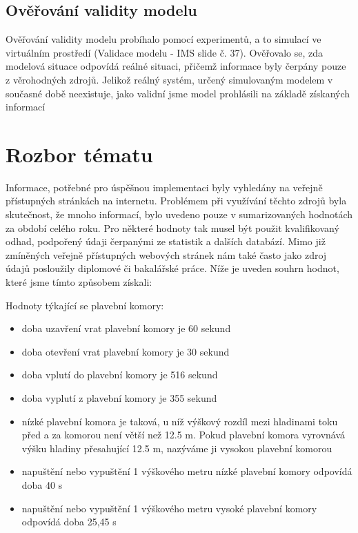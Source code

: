 \documentclass[11pt,a4paper]{article}
\begin{document}
    \subsection{Ověřování validity modelu}

      Ověřování validity modelu probíhalo pomocí experimentů, a to simulací ve
      virtuálním prostředí (Validace modelu - IMS slide č. 37). Ověřovalo se,
      zda modelová situace odpovídá reálné situaci, přičemž informace
      byly čerpány pouze z věrohodných zdrojů. Jelikož reálný systém,
      určený simulovaným modelem v současné době neexistuje, jako validní jsme
      model prohlásili na základě získaných informací

  \section{Rozbor tématu}

    Informace, potřebné pro úspěšnou implementaci byly vyhledány na veřejně
    přístupných stránkách na internetu. Problémem při využívání těchto zdrojů
    byla skutečnost, že mnoho informací, bylo uvedeno pouze v sumarizovaných
    hodnotách za období celého roku.  Pro některé hodnoty tak musel být použit
    kvalifikovaný odhad, podpořený údaji čerpanými ze statistik a dalších
    databází. Mimo již zmíněných veřejně přístupných webových stránek nám také
    často jako zdroj údajů posloužily diplomové či bakalářské práce. Níže je
    uveden souhrn hodnot, které jsme tímto způsobem získali:

    \noindent
    Hodnoty týkající se plavební komory:

    \begin{itemize}
      \item doba uzavření vrat plavební komory je 60 sekund
      \item doba otevření vrat plavební komory je 30 sekund
      \item doba vplutí do plavební komory je 516 sekund
      \item doba vyplutí z plavební komory je 355 sekund
      \item nízké plavební komora je taková, u níž výškový rozdíl mezi
            hladinami toku před a za komorou není větší než 12.5 m.
            Pokud plavební komora vyrovnává výšku hladiny přesahující 12.5 m,
            nazýváme ji vysokou plavební komorou
      \item napuštění nebo vypuštění 1 výškového metru nízké plavební komory
            odpovídá doba 40 s
      \item napuštění nebo vypuštění 1 výškového metru  vysoké plavební komory
            odpovídá doba 25,45 s
    \end{itemize}
\end{document}
